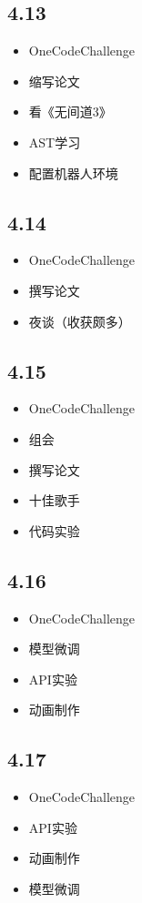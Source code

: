 \documentclass[UTF8]{ctexart}
\begin{document}
\subsection*{4.13}
\begin{itemize}
    \item OneCodeChallenge
    \item 缩写论文
    \item 看《无间道3》
    \item AST学习
    \item 配置机器人环境
\end{itemize}

\subsection*{4.14}
\begin{itemize}
    \item OneCodeChallenge
    \item 撰写论文
    \item 夜谈（收获颇多）
\end{itemize}

\subsection*{4.15}
\begin{itemize}
    \item OneCodeChallenge
    \item 组会
    \item 撰写论文
    \item 十佳歌手
    \item 代码实验
\end{itemize}

\subsection*{4.16}
\begin{itemize}
    \item OneCodeChallenge
    \item 模型微调
    \item API实验
    \item 动画制作
\end{itemize}

\subsection*{4.17}
\begin{itemize}
    \item OneCodeChallenge
    \item API实验
    \item 动画制作
    \item 模型微调
\end{itemize}
\end{document}
